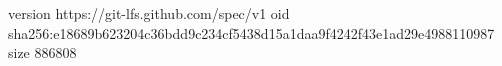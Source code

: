 version https://git-lfs.github.com/spec/v1
oid sha256:e18689b623204c36bdd9c234cf5438d15a1daa9f4242f43e1ad29e4988110987
size 886808
